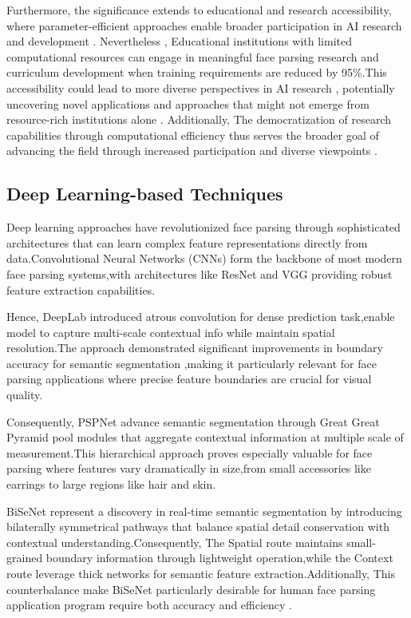 \documentclass[12pt,a4paper]{report}
\begin{document}
Furthermore, the significance extends to educational and research accessibility, where parameter-efficient approaches enable broader participation in AI research and development \cite{wing2006computational}. Nevertheless , Educational institutions with limited computational resources can engage in meaningful face parsing research and curriculum development when training requirements are reduced by 95\%.This accessibility could lead to more diverse perspectives in AI research , potentially uncovering novel applications and approaches that might not emerge from resource-rich institutions alone \cite{fazelpour2021algorithmic}. Additionally, The democratization of research capabilities through computational efficiency thus serves the broader goal of advancing the field through increased participation and diverse viewpoints \cite{gebru2018datasheets}.

\subsection{Deep Learning-based Techniques}

Deep learning approaches have revolutionized face parsing through sophisticated architectures that can learn complex feature representations directly from data.Convolutional Neural Networks (CNNs) form the backbone of most modern face parsing systems,with architectures like ResNet \cite{he2016deep} and VGG \cite{simonyan2014very} providing robust feature extraction capabilities. 

Hence, DeepLab \cite{chen2017deeplab} introduced atrous convolution for dense prediction task,enable model to capture multi-scale contextual info while maintain spatial resolution.The approach demonstrated significant improvements in boundary accuracy for semantic segmentation ,making it particularly relevant for face parsing applications where precise feature boundaries are crucial for visual quality.

Consequently, PSPNet \cite{zhao2017pyramid} advance semantic segmentation through Great Great Pyramid pool modules that aggregate contextual information at multiple scale of measurement.This hierarchical approach proves especially valuable for face parsing where features vary dramatically in size,from small accessories like earrings to large regions like hair and skin.

BiSeNet \cite{yu2018bisenet} represent a discovery in real-time semantic segmentation by introducing bilaterally symmetrical pathways that balance spatial detail conservation with contextual understanding.Consequently, The Spatial route maintains small-grained boundary information through lightweight operation,while the Context route leverage thick networks for semantic feature extraction.Additionally, This counterbalance make BiSeNet particularly desirable for human face parsing application program require both accuracy and efficiency .
\end{document}
